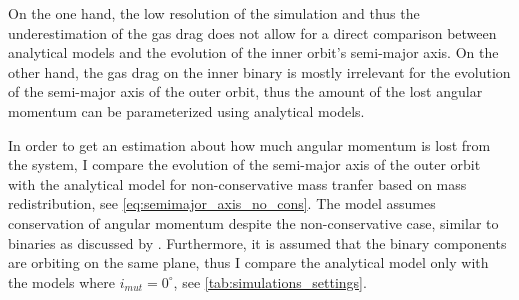 On the one hand, the low resolution of the simulation and thus the underestimation of the gas drag does not allow for a direct comparison between analytical models and the evolution of the inner orbit's semi-major axis. On the other hand, the gas drag on the inner binary is mostly irrelevant for the evolution of the semi-major axis of the outer orbit, thus the amount of the lost angular momentum can be parameterized using analytical models.

In order to get an estimation about how much angular momentum is lost from the system, I compare the evolution of the semi-major axis of the outer orbit with the analytical model for non-conservative mass tranfer based on mass redistribution, see \cref{eq:semimajor_axis_no_cons}. The model assumes conservation of angular momentum despite the non-conservative case, similar to binaries as discussed by \cite{portegies1995formation}. Furthermore, it is assumed that the binary components are orbiting on the same plane, thus I compare the analytical model only with the models where $i_{mut}=0^{\circ}$, see \cref{tab:simulations_settings}.

